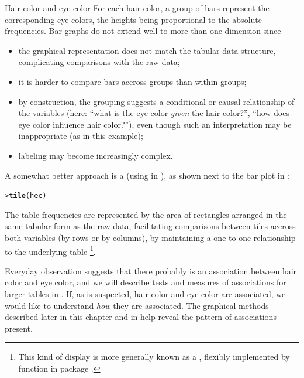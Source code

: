 \documentclass[10pt,krantz2]{krantz}\usepackage[]{graphicx}\usepackage[]{color}
\makeatletter
\newcommand{\hlstd}[1]{\textcolor[rgb]{0.345,0.345,0.345}{#1}}%
\newcommand{\hlkwd}[1]{\textcolor[rgb]{0.737,0.353,0.396}{\textbf{#1}}}%
\newenvironment{kframe}{%
 \def\at@end@of@kframe{}%
 \ifinner\ifhmode%
  \def\at@end@of@kframe{\end{minipage}}%
  \begin{minipage}{\columnwidth}%
 \fi\fi%
 \def\FrameCommand##1{\hskip\@totalleftmargin \hskip-\fboxsep
 \colorbox{shadecolor}{##1}\hskip-\fboxsep
     \hskip-\linewidth \hskip-\@totalleftmargin \hskip\columnwidth}%
 \MakeFramed {\advance\hsize-\width
   \@totalleftmargin\z@ \linewidth\hsize
   \@setminipage}}%
 {\par\unskip\endMakeFramed%
 \at@end@of@kframe}
\newenvironment{knitrout}{}{} %
\renewenvironment{knitrout}{\small\renewcommand{\baselinestretch}{.85}}{} %
\makeatother
\begin{document}
\begin{Example}[haireye1]{Hair color and eye color}
\begin{knitrout}
\end{knitrout}
\noindent For each hair
color, a group of bars represent the corresponding eye colors, the
heights being proportional to the absolute frequencies. Bar graphs do
not extend well to more than one dimension since
\begin{itemize}
\item the graphical representation does not match the tabular data structure,
  complicating comparisons with the raw data;
\item it is harder to compare bars accross groups than within groups;
\item by construction, the grouping suggests a conditional
or causal relationship of the variables (here: ``what is the eye color
  \emph{given} the hair color?'', ``how does eye color influence hair color?''), even
  though such an interpretation may be inappropriate (as in this example);
\item labeling may become increasingly complex.
\end{itemize}
A somewhat better approach is a  (using  in ), as shown next to the bar
plot in :
\begin{knitrout}
\color{fgcolor}\begin{kframe}
\begin{alltt}
\hlstd{> }\hlkwd{tile}\hlstd{(hec)}
\end{alltt}
\end{kframe}
\end{knitrout}
\noindent The table frequencies are represented by the area of
rectangles arranged in the same tabular form as the raw data,
facilitating comparisons between tiles accross both variables (by rows
or by columns), by maintaining a one-to-one relationship to the
underlying table%
\footnote{This kind of display is more generally known as a
 \citep{Hofmann:00}, 
flexibly implemented by function  in package .}.

Everyday observation suggests that there probably is an association
between hair color and eye color, and we will describe tests
and measures of associations for larger tables in
.
If, as is suspected, hair color and eye color are associated,
we would like to understand \emph{how} they are associated.
The graphical methods described later in this chapter
and in  help
reveal the pattern of associations present.
\end{Example}
\end{document}
